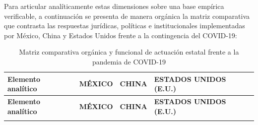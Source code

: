 \documentclass[12pt,spanish,letterpaper,oneside]{article}
\begin{document}
Para articular anal\'iticamente estas dimensiones sobre una base emp\'irica verificable, a continuaci\'on se presenta de manera org\'anica la matriz comparativa que contrasta las respuestas jur\'idicas, pol\'iticas e institucionales implementadas por M\'exico, China y Estados Unidos frente a la contingencia del COVID-19:

\clearpage
\pagestyle{empty}
\begin{landscape}
\begingroup
\scriptsize
\setlength{\tabcolsep}{4pt}
\renewcommand{\arraystretch}{1.08}
\setlength{\LTpre}{0pt}
\setlength{\LTpost}{0pt}
\begin{longtable}{@{}L{3.3cm} L{6.15cm} L{6.15cm} L{6.15cm}@{}}
\caption{Matriz comparativa org\'anica y funcional de actuaci\'on estatal frente a la pandemia de COVID-19}\label{tab:matriz-comparativa}\\
\toprule
{}
\textbf{Elemento anal\'itico} & \textbf{M\'EXICO} & \textbf{CHINA} & \textbf{ESTADOS UNIDOS (E.U.)} \\
\midrule
\endfirsthead
\toprule
{}
\textbf{Elemento anal\'itico} & \textbf{M\'EXICO} & \textbf{CHINA} & \textbf{ESTADOS UNIDOS (E.U.)} \\
\midrule
\endhead
\bottomrule
\endfoot


\end{longtable}
\end{landscape}
\end{document}
